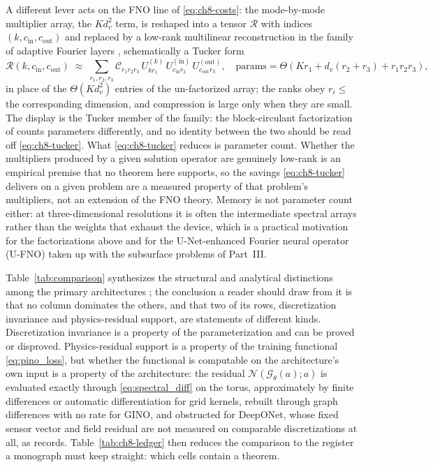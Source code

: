 A different lever acts on the FNO line of \eqref{eq:ch8-costs}: the mode-by-mode multiplier array, the $K d_v^{2}$ term, is reshaped into a tensor $\mathcal{R}$ with indices $(k,c_{\mathrm{in}},c_{\mathrm{out}})$ and replaced by a low-rank multilinear reconstruction in the family of adaptive Fourier layers \cite{guibas2021afno}, schematically a Tucker form
\begin{equation}
  \label{eq:ch8-tucker}
  \mathcal{R}(k,c_{\mathrm{in}},c_{\mathrm{out}})
  \;\approx\;
  \sum_{r_1,r_2,r_3}\mathcal{C}_{r_1r_2r_3}\,
  U^{(k)}_{k r_1}\,U^{(\mathrm{in})}_{c_{\mathrm{in}} r_2}\,U^{(\mathrm{out})}_{c_{\mathrm{out}} r_3},
  \quad
  \text{params} = \Theta\!\left(K r_1 + d_v(r_2+r_3) + r_1r_2r_3\right),
\end{equation}
in place of the $\Theta(Kd_v^{2})$ entries of the un-factorized array; the ranks obey $r_i\le$ the corresponding dimension, and compression is large only when they are small. The display is the Tucker member of the family: the block-circulant factorization of \cite{guibas2021afno} counts parameters differently, and no identity between the two should be read off \eqref{eq:ch8-tucker}. What \eqref{eq:ch8-tucker} reduces is parameter count. Whether the multipliers produced by a given solution operator are genuinely low-rank is an empirical premise that no theorem here supports, so the savings \eqref{eq:ch8-tucker} delivers on a given problem are a measured property of that problem's multipliers, not an extension of the FNO theory. Memory is not parameter count either: at three-dimensional resolutions it is often the intermediate spectral arrays rather than the weights that exhaust the device, which is a practical motivation for the factorizations above and for the U-Net-enhanced Fourier neural operator (U-FNO) \cite{wen2022ufno} taken up with the subsurface problems of Part~III.

Table~\ref{tab:comparison} synthesizes the structural and analytical distinctions among the primary architectures ; the conclusion a reader should draw from it is that no column dominates the others, and that two of its rows, discretization invariance and physics-residual support, are statements of different kinds. Discretization invariance is a property of the parameterization and can be proved or disproved. Physics-residual support is a property of the training functional \eqref{eq:pino_loss}, but whether the functional is computable on the architecture's own input is a property of the architecture: the residual $\mathcal{N}(\mathcal{G}_\theta(a);a)$ is evaluated exactly through \eqref{eq:spectral_diff} on the torus, approximately by finite differences or automatic differentiation for grid kernels, rebuilt through graph differences with no rate for GINO, and obstructed for DeepONet, whose fixed sensor vector and field residual are not measured on comparable discretizations at all, as  records. Table~\ref{tab:ch8-ledger} then reduces the comparison to the register a monograph must keep straight: which cells contain a theorem.

